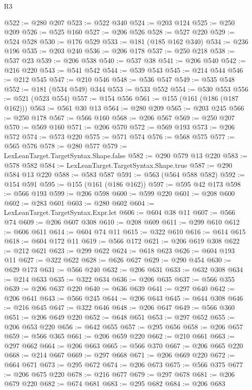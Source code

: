 \begin{lexlean}{R3}
\begin{coremodule}
@522 := @280 @207
@523 := @522 @340
@524 := @203 @124
@525 := @250 @209
@526 := @525 @160
@527 := @206 @526
@528 := @527 @220
@529 := @524 @528
@530 := @176 @529
@533 := @181 (@185 @162 @340)
@534 := @236 @196
@535 := @203 @240
@536 := @206 @178
@537 := @250 @218
@538 := @537 @23
@539 := @206 @538
@540 := @537 @38
@541 := @206 @540
@542 := @216 @220
@543 := @541 @542
@544 := @539 @543
@545 := @214 @544
@546 := @212 @545
@547 := @210 @546
@548 := @536 @547
@549 := @535 @548
@552 := @181 (@534 @549) @344
@553 := @533 @552
@554 := @530 @553
@556 := @521 (@523 @554)
@557 := @154 @556
@561 := @155 (@161 (@186 (@187 @162)))
@563 := @561 @30 @13
@564 := @280 @209
@565 := @203 @245
@566 := @250 @178
@567 := @566 @160
@568 := @206 @567
@569 := @250 @207
@570 := @569 @160
@571 := @206 @570
@572 := @569 @193
@573 := @206 @572
@574 := @573 @220
@575 := @571 @574
@576 := @568 @575
@577 := @565 @576
@578 := @280 @577
@579 := LexLeanTarget.TargetSyntax.Shape.false
@582 := @290 @579 @13 @220
@583 := @578 @582
@584 := LexLeanTarget.TargetSyntax.Shape.true
@587 := @290 @584 @13 @220
@588 := @583 @587
@591 := @563 (@564 @588 @582)
@592 := @154 @591
@595 := @155 (@161 (@186 @162))
@597 := @595 @42 @173
@598 := @566 @193
@599 := @206 @598
@600 := @599 @220
@601 := @208 @600
@602 := @283 @601
@603 := @280 @602
@604 := LexLeanTarget.TargetSyntax.Expr.let
@606 := @604 @38 @11
@607 := @566 @74
@609 := @206 @607 @308
@610 := @208 @609
@611 := @299 @610
@612 := @606 @611
@614 := @604 @74 @11
@615 := @322 @610
@616 := @614 @615
@618 := @604 @172 @11
@619 := @566 @172
@621 := @206 @619 @308
@622 := @212 @621
@623 := @299 @622
@624 := @618 @623
@626 := @604 @193 @11
@627 := @322 @622
@628 := @626 @627
@629 := @290 @454
@630 := @629 @173
@631 := @566 @240
@632 := @206 @631
@633 := @632 @308
@634 := @214 @633
@635 := @322 @634
@636 := @206 @635
@637 := @566 @355
@639 := @206 @637 @220
@640 := @636 @639
@641 := @297 @640
@642 := @206 @641
@643 := @566 @245
@644 := @206 @643
@645 := @644 @308
@646 := @216 @645
@647 := @322 @646
@648 := @206 @647
@649 := @566 @360
@651 := @206 @649 @220
@652 := @648 @651
@653 := @297 @652
@655 := @206 @653 @220
@656 := @642 @655
@657 := @295 @656
@658 := @206 @657
@659 := @566 @365
@661 := @206 @659 @220
@662 := @210 @661
@663 := @297 @662
@664 := @206 @663
@665 := @566 @370
@667 := @206 @665 @220
@668 := @214 @667
@669 := @297 @668
@671 := @206 @669 @220
@672 := @664 @671
@673 := @295 @672
@674 := @206 @673
@675 := @566 @375
@677 := @206 @675 @220
@678 := @216 @677
@679 := @297 @678
@681 := @206 @679 @220
@682 := @674 @681
@683 := @295 @682
@684 := @206 @683

\end{coremodule}
\end{lexlean}

